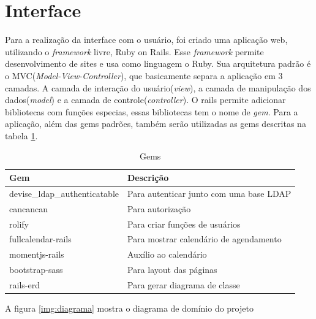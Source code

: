 \section{Interface} %
\label{sub:interface}
  Para a realização da interface com o usuário, foi criado uma aplicação web, utilizando o \textit{framework} livre, Ruby on Rails\cite{rails}.
Esse \textit{framework} permite desenvolvimento de sites e usa como linguagem o Ruby. Sua arquitetura padrão é o MVC(\textit{Model-View-Controller}),
 que basicamente separa a aplicação em 3 camadas. A camada de interação do usuário(\textit{view}), a camada de manipulação dos dados(\textit{model}) 
e a camada de controle(\textit{controller})\cite{mvc}.
  O rails permite adicionar bibliotecas com funções especias, essas bibliotecas tem o nome de \textit{gem}. Para a aplicação, além das gems padrões, também serão utilizadas as gems descritas na tabela \ref{gems}.
\begin{table}[H]
\centering
\caption{Gems}
\label{gems}
\begin{tabular}{|l|l|}
\hline
\rowcolor[HTML]{C0C0C0} 
{\color[HTML]{333333} \textbf{Gem}} & {\color[HTML]{333333} \textbf{Descrição}} \\ \hline
devise\_ldap\_authenticatable       & Para autenticar junto com uma base LDAP   \\ \hline
cancancan                           & Para autorização                          \\ \hline
rolify                              & Para criar funções de usuários            \\ \hline
fullcalendar-rails                  & Para mostrar calendário de agendamento    \\ \hline
momentjs-rails                      & Auxílio ao calendário                     \\ \hline
bootstrap-sass                      & Para layout das páginas                   \\ \hline
rails-erd                           & Para gerar diagrama de classe             \\ \hline
\end{tabular}
\end{table}

A figura \ref{img:diagrama} mostra o diagrama de domínio do projeto


